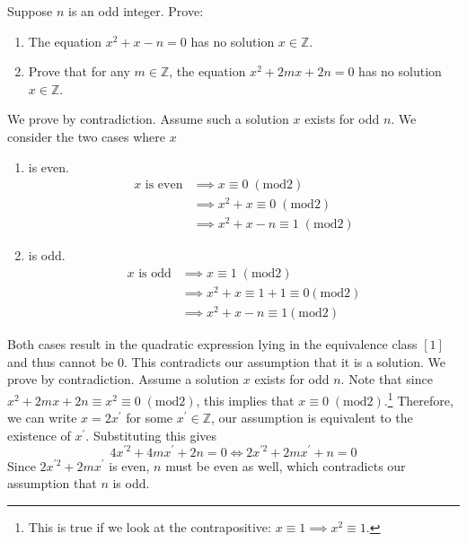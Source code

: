   \begin{exercise}
    Suppose $n$ is an odd integer. Prove:
    \begin{enumerate}
      \item The equation $x^2 + x - n = 0$ has no solution $x \in \mathbb{Z}$.
      \item Prove that for any $m \in \mathbb{Z}$, the equation $x^2 + 2mx + 2n = 0$ has no solution $x \in \mathbb{Z}$.
    \end{enumerate}
  \end{exercise}
  \begin{solution}
    We prove by contradiction. Assume such a solution $x$ exists for odd $n$. We consider the two cases where $x$ 
    \begin{enumerate}
      \item is even. 
      \begin{align}
        x \text{ is even} & \implies x \equiv 0 \; (\mathrm{mod } 2) \\
                          & \implies x^2 + x \equiv 0 \; (\mathrm{mod } 2) \\
                          & \implies x^2 + x - n \equiv 1 \; (\mathrm{mod } 2)
      \end{align} 

      \item is odd. 
      \begin{align}
        x \text{ is odd} & \implies x \equiv 1 \; (\mathrm{mod } 2) \\
                         & \implies x^2 + x \equiv 1 + 1 \equiv 0 (\mathrm{mod } 2) \\
                         & \implies x^2 + x - n \equiv 1 (\mathrm{mod } 2) 
      \end{align}
    \end{enumerate}
    Both cases result in the quadratic expression lying in the equivalence class $[1]$ and thus cannot be $0$. This contradicts our assumption that it is a solution. 
    We prove by contradiction. Assume a solution $x$ exists for odd $n$. Note that since $x^2 + 2mx + 2n \equiv x^2 \equiv 0 \; (\mathrm{mod } 2)$, this implies that $x \equiv 0 \; (\mathrm{mod } 2)$.\footnote{This is true if we look at the contrapositive: $x \equiv 1 \implies x^2 \equiv 1$. } Therefore, we can write $x = 2x^\prime$ for some $x^\prime \in \mathbb{Z}$, our assumption is equivalent to the existence of $x^\prime$. Substituting this gives 
    \begin{equation}
      4 x^{\prime 2} + 4 m x^\prime + 2n = 0 \iff 2x^{\prime 2} + 2m x^\prime + n = 0
    \end{equation} 
    Since $2x^{\prime 2} + 2 m x^\prime$ is even, $n$ must be even as well, which contradicts our assumption that $n$ is odd. 
  \end{solution}

